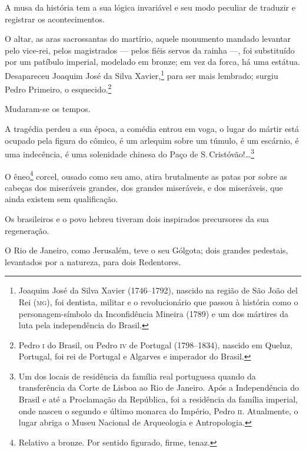 \noindent\dotfill{}

A musa da história tem a sua lógica invariável e seu modo peculiar de
traduzir e registrar os acontecimentos.

O altar, as aras sacrossantas do martírio, aquele monumento mandado
levantar pelo vice-rei, pelos magistrados --- pelos fiéis servos da
rainha ---, foi substituído por um patíbulo imperial, modelado em
bronze; em vez da forca, há uma estátua. Desapareceu Joaquim José da
Silva Xavier,\footnote{Joaquim José da Silva Xavier (1746--1792),
  nascido na região de São João del Rei (\textsc{mg}), foi dentista, militar e o
  revolucionário que passou à história como o personagem-símbolo da
  Inconfidência Mineira (1789) e um dos mártires da luta pela
  independência do Brasil.} para ser mais lembrado; surgiu Pedro
Primeiro, o esquecido.\footnote{Pedro \textsc{i} do Brasil, ou Pedro \textsc{iv} de
  Portugal (1798--1834), nascido em Queluz, Portugal, foi rei de Portugal
  e Algarves e imperador do Brasil.}

Mudaram-se os tempos.

A tragédia perdeu a sua época, a comédia entrou em voga, o lugar do
mártir está ocupado pela figura do cômico, é um arlequim sobre um
túmulo, é um escárnio, é uma indecência, é uma solenidade chinesa do
Paço de S.\,Cristóvão!\ldots{}\footnote{Um dos locais de residência
  da família real portuguesa quando da transferência da
  Corte de Lisboa ao Rio de Janeiro. Após a Independência do Brasil e até a Proclamação da República, foi a residência da família
  imperial, onde nasceu o segundo e último monarca do
  Império, Pedro \textsc{ii}. Atualmente, o lugar abriga o Museu Nacional de Arqueologia e Antropologia.}

O êneo\footnote{Relativo a bronze. Por sentido figurado, firme, tenaz.}
corcel, ousado como seu amo, atira brutalmente as patas por sobre as
cabeças dos miseráveis grandes, dos grandes miseráveis, e dos
miseráveis, que ainda existem sem qualificação.

Os brasileiros e o povo hebreu tiveram dois inspirados precursores da
sua regeneração.

O Rio de Janeiro, como Jerusalém, teve o seu Gólgota; dois grandes
pedestais, levantados por a natureza, para dois Redentores.

